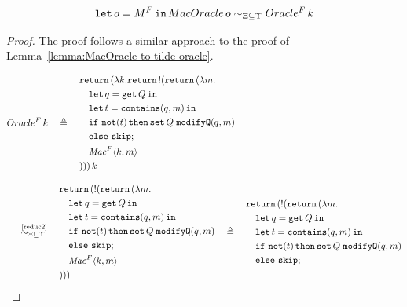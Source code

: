 \begin{lemma}\label{lemma:MacOracle-to-oracleF}
\[ \mathtt{let}\,o=M^F\,\mathtt{in}\, MacOracle\,o\sim_{\Xi\subseteq\Upsilon} Oracle^F\,k \]
\end{lemma}
\begin{proof}
The proof follows a similar approach to the proof of Lemma~\ref{lemma:MacOracle-to-tilde-oracle}.

\small{
\begin{align}
    &Oracle^F\,k \nonumber \quad\triangleq\quad 
    \begin{aligned}
        &\return(\lambda k.\return \bang(\return(\lambda m. \\
        &\quad \letin{q=\get Q}{} \\
        &\quad \letin{t=\mathtt{contains}(q,m)}{} \\
        &\quad \mathtt{if}\ \mathtt{not}(t)\,\mathtt{then} \, \mathtt{set}\,Q\;\mathtt{modifyQ}(q,m) \\
        &\quad\mathtt{else}\ \mathtt{skip}; \\
        &\quad \mathit{Mac}^F\lis{k,m} \\
        &)))\,k
    \end{aligned} \nonumber
    \\[2ex]
    &\quad\overset{\text{~\ref{reduc2}}}{\simcontext}\quad
    \begin{aligned}
        &\return(\bang(\return(\lambda m. \\
        &\quad \letin{q=\get Q}{} \\
        &\quad \letin{t=\mathtt{contains}(q,m)}{} \\
        &\quad \mathtt{if}\ \mathtt{not}(t)\,\mathtt{then} \, \mathtt{set}\,Q\;\mathtt{modifyQ}(q,m) \\
        &\quad\mathtt{else}\ \mathtt{skip}; \\
        &\quad \mathit{Mac}^F\lis{k,m} \\
        &)))
    \end{aligned} \nonumber
    \quad\triangleq\quad
    \begin{aligned}
        &\return(\bang(\return(\lambda m. \\
        &\quad \letin{q=\get Q}{} \\
        &\quad \letin{t=\mathtt{contains}(q,m)}{} \\
        &\quad \mathtt{if}\ \mathtt{not}(t)\,\mathtt{then} \, \mathtt{set}\,Q\;\mathtt{modifyQ}(q,m) \\
        &\quad\mathtt{else}\ \mathtt{skip}; \\

\end{aligned}
\end{align}}
\end{proof}
